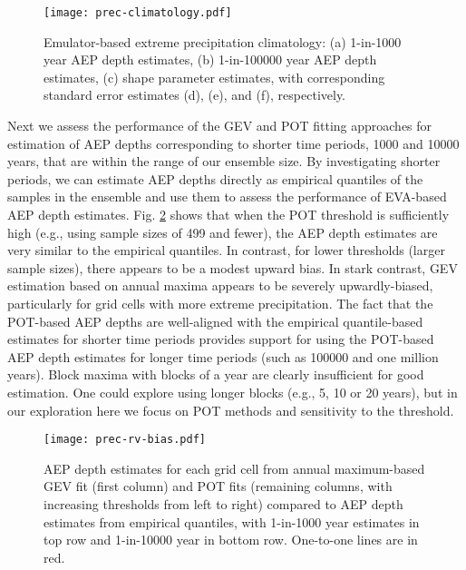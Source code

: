 \documentclass{ametsocV6.1}
\begin{document}
\begin{figure}
    \centering
    \texttt{[image: prec-climatology.pdf]}
    \caption{Emulator-based extreme precipitation climatology: (a) 1-in-1000 year AEP depth estimates, (b) 1-in-100000 year AEP depth estimates, (c) shape parameter estimates, with corresponding standard error estimates (d), (e), and (f), respectively.}
    \label{fig:prec-climate}
\end{figure}

Next we assess the performance of the GEV and POT fitting approaches for estimation of AEP depths corresponding to shorter time periods, 1000 and 10000 years, that are within the range of our ensemble size. By investigating shorter periods, we can estimate AEP depths directly as empirical quantiles of the samples in the ensemble and use them to assess the performance of EVA-based AEP depth estimates. Fig. \ref{fig:prec-rv-bias} shows that when the POT threshold is sufficiently high (e.g., using sample sizes of 499 and fewer), the AEP depth estimates are very similar to the empirical quantiles. In contrast, for lower thresholds (larger sample sizes), there appears to be a modest upward bias. In stark contrast, GEV estimation based on annual maxima appears to be severely upwardly-biased, particularly for grid cells with more extreme precipitation.
The fact that the POT-based AEP depths are well-aligned with the empirical quantile-based estimates for shorter time periods provides support for using the POT-based AEP depth estimates for longer time periods (such as 100000 and one million years). Block maxima with blocks of a year are clearly insufficient for good estimation. One could explore using longer blocks (e.g., 5, 10 or 20 years), but in our exploration here we focus on POT methods and sensitivity to the threshold.

\begin{figure}
    \centering
    \texttt{[image: prec-rv-bias.pdf]}
    \caption{AEP depth estimates for each grid cell from annual maximum-based GEV fit (first column) and POT fits (remaining columns, with increasing thresholds from left to right) compared to AEP depth estimates from empirical quantiles, with 1-in-1000 year estimates in top row and 1-in-10000 year in bottom row. One-to-one lines are in red.}
    \label{fig:prec-rv-bias}
\end{figure}
\end{document}
